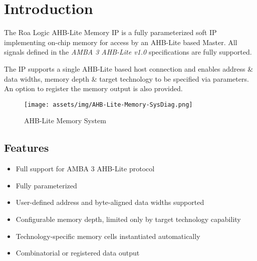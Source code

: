 \chapter{Introduction}\label{introduction}

The Roa Logic AHB-Lite Memory IP is a fully parameterized soft IP
implementing on-chip memory for access by an AHB-Lite based Master. 
All signals defined in the \emph{AMBA 3 AHB-Lite v1.0} specifications are
fully supported.

The IP supports a single AHB-Lite based host connection and enables
address \& data widths, memory depth \& target technology to be
specified via parameters. An option to register the memory output is
also provided.

\begin{figure}[th]
	\centering
	\texttt{[image: assets/img/AHB-Lite-Memory-SysDiag.png]}
	\caption{AHB-Lite Memory System}
	\label{fig:ahb-lite-memory-sysdiag}
\end{figure}

\section{Features}\label{features}

\begin{itemize}
\item
  Full support for AMBA 3 AHB-Lite protocol
\item
  Fully parameterized
\item
  User-defined address and byte-aligned data widths supported
\item
  Configurable memory depth, limited only by target technology
  capability
\item
  Technology-specific memory cells instantiated automatically
\item
  Combinatorial or registered data output
\end{itemize}